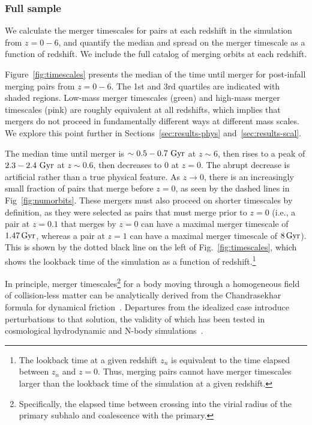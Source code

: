 \documentclass[twocolumn,linenumbers]{aastex631}
\begin{document}
    \subsubsection{Full sample}
        We calculate the merger timescales for pairs at each redshift in the simulation from $z=0-6$, and quantify the median and spread on the merger timescale as a function of redshift. 
        We include the full catalog of merging orbits at each redshift.%
        
        Figure~\ref{fig:timescales} presents the median of the time until merger for post-infall merging pairs from $z=0-6$. 
        The 1st and 3rd quartiles are indicated with shaded regions. 
        Low-mass merger timescales (green) and high-mass merger timescales (pink) are roughly equivalent at all redshifts, which implies that mergers do not proceed in fundamentally different ways at different mass scales. 
        We explore this point further in Sections~\ref{sec:results-phys} and~\ref{sec:results-scal}.
        
        The median time until merger is $\sim0.5-0.7\,\mathrm{\,Gyr}$ at $z\sim6$, then rises to a peak of $2.3-2.4\,\mathrm{\,Gyr}$ at $z\sim0.6$, then decreases to 0 at $z=0$.
        The abrupt decrease is artificial rather than a true physical feature. 
        As $z\to0$, there is an increasingly small fraction of pairs that merge before $z=0$, as seen by the dashed lines in Fig~\ref{fig:numorbits}. 
        These mergers must also proceed on shorter timescales by definition, as they were selected as pairs that must merge prior to $z=0$ (i.e., a pair at $z=0.1$ that merges by $z=0$ can have a maximal merger timescale of $1.47\mathrm{\,Gyr}$, whereas a pair at $z=1$ can have a maximal merger timescale of $8\mathrm{\,Gyr}$). 
        This is shown by the dotted black line on the left of Fig.~\ref{fig:timescales}, which shows the lookback time of the simulation as a function of redshift.\footnote{The lookback time at a given redshift $z_n$ is equivalent to the time elapsed between $z_n$ and $z=0$. Thus, merging pairs cannot have merger timescales larger than the lookback time of the simulation at a given redshift.} 

        In principle, merger timescales\footnote{Specifically, the elapsed time between crossing into the virial radius of the primary subhalo and coalescence with the primary.} for a body moving through a homogeneous field of collision-less matter can be analytically derived from the Chandrasekhar formula for dynamical friction~\citep{Binney2008}. 
        Departures from the idealized case introduce perturbations to that solution, the validity of which has been tested in cosmological hydrodynamic and N-body simulations~\citep{Jiang2008, BoylanKolchin2008}. 
\end{document}
